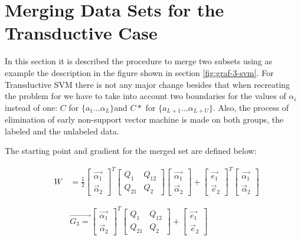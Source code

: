 \section{Merging Data Sets for the Transductive Case}

In this section it is described the procedure to merge two subsets
using as example the description in the figure shown in section \ref{fig:graf-3-svm}.
For Transductive SVM there is not any major change besides that
when recreating the problem for  we have
to take into account two boundaries for the values of $\alpha_{i}$
instead of one: $C$ for $\{a_{1}...\alpha_{L}\}$and $C*$ for $\{a_{L+1}...\alpha_{L+U}\}$.
Also, the process of elimination of early non-support vector machine
 is made on both groups, the labeled and the unlabeled data. 

The starting point and gradient for the merged set are defined below:

\begin{eqnarray}
 & W\, & =\frac{1}{2}\left[\begin{array}{c}
\vec{\alpha_{1}}\\
\vec{\alpha}_{2}\end{array}\right]^{T}\left[\begin{array}{cc}
Q_{1} & Q_{12}\\
Q_{21} & Q_{2}\end{array}\right]\left[\begin{array}{c}
\vec{\alpha_{1}}\\
\vec{\alpha}_{2}\end{array}\right]+\left[\begin{array}{c}
\vec{e_{1}}\\
\vec{e}_{2}\end{array}\right]^{T}\left[\begin{array}{c}
\vec{\alpha_{1}}\\
\vec{\alpha}_{2}\end{array}\right]\nonumber \\
\label{eq:mergin-subsets}\\\nonumber \\ &  & \vec{G_{3}=}\left[\begin{array}{c}
\vec{\alpha_{1}}\\
\vec{\alpha}_{2}\end{array}\right]^{T}\left[\begin{array}{cc}
Q_{1} & Q_{12}\\
Q_{21} & Q_{2}\end{array}\right]+\left[\begin{array}{c}
\vec{e_{1}}\\
\vec{e}_{2}\end{array}\right]\nonumber \end{eqnarray}

